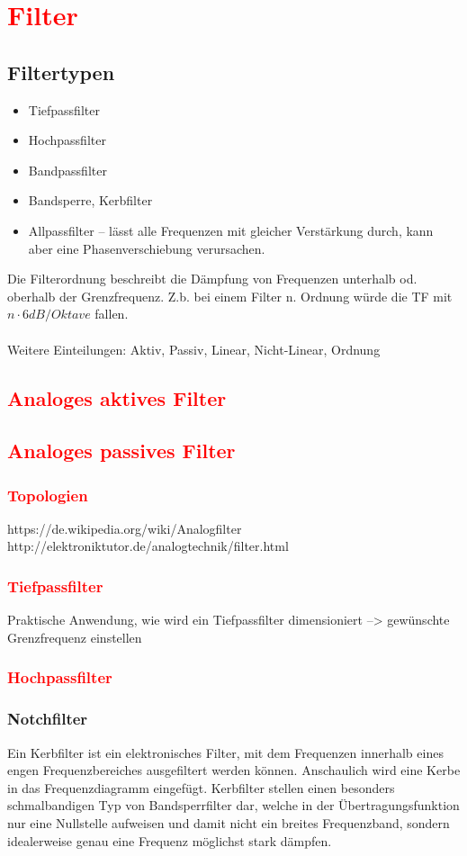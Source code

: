 	\section{\textcolor{red}{Filter}}
		\subsection{Filtertypen}
		\begin{itemize}
			\item Tiefpassfilter
			\item Hochpassfilter
			\item Bandpassfilter
			\item Bandsperre, Kerbfilter
			\item Allpassfilter – lässt alle Frequenzen mit gleicher Verstärkung durch, kann aber eine Phasenverschiebung verursachen.
		\end{itemize}
		Die Filterordnung beschreibt die Dämpfung von Frequenzen unterhalb od. oberhalb der Grenzfrequenz. Z.b. bei einem Filter n. Ordnung würde die TF mit $ n\cdot6dB/Oktave $ fallen.\\\\
		Weitere Einteilungen: Aktiv, Passiv, Linear, Nicht-Linear, Ordnung
		\subsection{\textcolor{red}{Analoges aktives Filter}}
		\subsection{\textcolor{red}{Analoges passives Filter}}
			\subsubsection{\textcolor{red}{Topologien}}
			https://de.wikipedia.org/wiki/Analogfilter\\
			http://elektroniktutor.de/analogtechnik/filter.html
			\subsubsection{\textcolor{red}{Tiefpassfilter}}
				Praktische Anwendung, wie wird ein Tiefpassfilter dimensioniert --> gewünschte Grenzfrequenz einstellen
			\subsubsection{\textcolor{red}{Hochpassfilter}}
			\subsubsection{Notchfilter}
				Ein Kerbfilter ist ein elektronisches Filter, mit dem Frequenzen innerhalb eines engen Frequenzbereiches ausgefiltert werden können. Anschaulich wird eine Kerbe in das Frequenzdiagramm eingefügt.
				Kerbfilter stellen einen besonders schmalbandigen Typ von Bandsperrfilter dar, welche in der Übertragungsfunktion nur eine Nullstelle aufweisen und damit nicht ein breites Frequenzband, sondern idealerweise genau eine Frequenz möglichst stark dämpfen.
				
